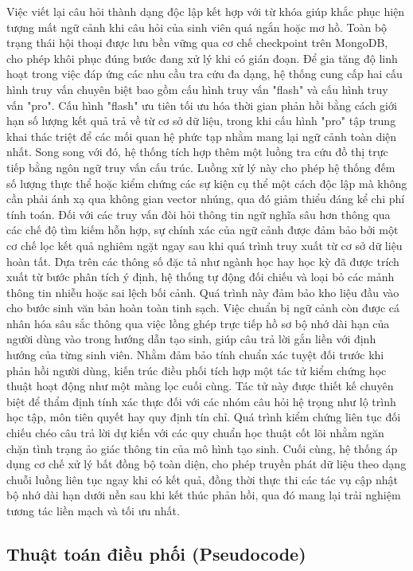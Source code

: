 Việc viết lại câu hỏi thành dạng độc lập kết hợp với từ khóa giúp khắc phục hiện tượng mất ngữ cảnh khi câu hỏi của sinh viên quá ngắn hoặc mơ hồ. Toàn bộ trạng thái hội thoại được lưu bền vững qua cơ chế checkpoint trên MongoDB, cho phép khôi phục đúng bước đang xử lý khi có gián đoạn. Để gia tăng độ linh hoạt trong việc đáp ứng các nhu cầu tra cứu đa dạng, hệ thống cung cấp hai cấu hình truy vấn chuyên biệt bao gồm cấu hình truy vấn "flash" và cấu hình truy vấn "pro". Cấu hình "flash" ưu tiên tối ưu hóa thời gian phản hồi bằng cách giới hạn số lượng kết quả trả về từ cơ sở dữ liệu, trong khi cấu hình "pro" tập trung khai thác triệt để các mối quan hệ phức tạp nhằm mang lại ngữ cảnh toàn diện nhất. Song song với đó, hệ thống tích hợp thêm một luồng tra cứu đồ thị trực tiếp bằng ngôn ngữ truy vấn cấu trúc. Luồng xử lý này cho phép hệ thống đếm số lượng thực thể hoặc kiểm chứng các sự kiện cụ thể một cách độc lập mà không cần phải ánh xạ qua không gian vector nhúng, qua đó giảm thiểu đáng kể chi phí tính toán. Đối với các truy vấn đòi hỏi thông tin ngữ nghĩa sâu hơn thông qua các chế độ tìm kiếm hỗn hợp, sự chính xác của ngữ cảnh được đảm bảo bởi một cơ chế lọc kết quả nghiêm ngặt ngay sau khi quá trình truy xuất từ cơ sở dữ liệu hoàn tất. Dựa trên các thông số đặc tả như ngành học hay học kỳ đã được trích xuất từ bước phân tích ý định, hệ thống tự động đối chiếu và loại bỏ các mảnh thông tin nhiễu hoặc sai lệch bối cảnh. Quá trình này đảm bảo kho liệu đầu vào cho bước sinh văn bản hoàn toàn tinh sạch. Việc chuẩn bị ngữ cảnh còn được cá nhân hóa sâu sắc thông qua việc lồng ghép trực tiếp hồ sơ bộ nhớ dài hạn của người dùng vào trong hướng dẫn tạo sinh, giúp câu trả lời gắn liền với định hướng của từng sinh viên. Nhằm đảm bảo tính chuẩn xác tuyệt đối trước khi phản hồi người dùng, kiến trúc điều phối tích hợp một tác tử kiểm chứng học thuật hoạt động như một màng lọc cuối cùng. Tác tử này được thiết kế chuyên biệt để thẩm định tính xác thực đối với các nhóm câu hỏi hệ trọng như lộ trình học tập, môn tiên quyết hay quy định tín chỉ. Quá trình kiểm chứng liên tục đối chiếu chéo câu trả lời dự kiến với các quy chuẩn học thuật cốt lõi nhằm ngăn chặn tình trạng ảo giác thông tin của mô hình tạo sinh. Cuối cùng, hệ thống áp dụng cơ chế xử lý bất đồng bộ toàn diện, cho phép truyền phát dữ liệu theo dạng chuỗi luồng liên tục ngay khi có kết quả, đồng thời thực thi các tác vụ cập nhật bộ nhớ dài hạn dưới nền sau khi kết thúc phản hồi, qua đó mang lại trải nghiệm tương tác liền mạch và tối ưu nhất.

\subsection{Thuật toán điều phối (Pseudocode)}

